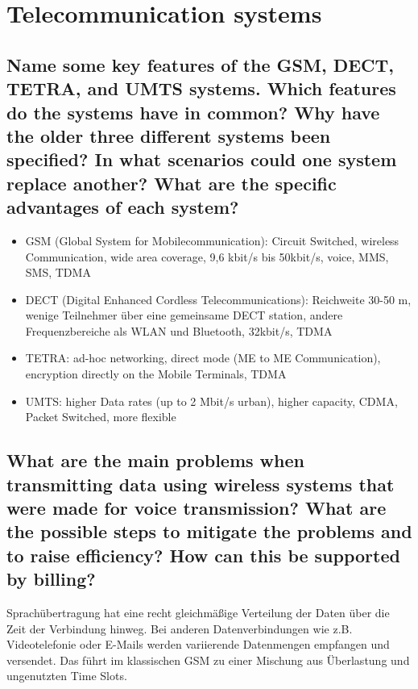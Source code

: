 \section{Telecommunication systems}

\subsection{Name some key features of the GSM, DECT, TETRA, and UMTS systems. Which
features do the systems have in common? Why have the older three different
systems been specified? In what scenarios could one system replace another? What
are the specific advantages of each system?}
\begin{itemize}

\item GSM (Global System for Mobilecommunication): Circuit Switched, wireless Communication, wide area coverage, 9,6 kbit/s bis 50kbit/s, voice, MMS, SMS, TDMA

\item DECT (Digital Enhanced Cordless Telecommunications): Reichweite 30-50 m, wenige Teilnehmer über eine gemeinsame DECT station, andere Frequenzbereiche als WLAN und Bluetooth, 32kbit/s, TDMA

\item TETRA: ad-hoc networking, direct mode (ME to ME Communication), encryption directly on the Mobile Terminals, TDMA

\item UMTS: higher Data rates (up to 2 Mbit/s urban), higher capacity, CDMA, Packet Switched, more flexible

\end{itemize}



\subsection{What are the main problems when transmitting data using wireless systems that were
made for voice transmission? What are the possible steps to mitigate the problems
and to raise efficiency? How can this be supported by billing?}

Sprachübertragung hat eine recht gleichmäßige Verteilung der Daten über die Zeit der Verbindung hinweg. Bei anderen Datenverbindungen wie z.B. Videotelefonie oder E-Mails werden variierende Datenmengen empfangen und versendet. Das führt im klassischen GSM zu einer Mischung aus Überlastung und ungenutzten Time Slots.

